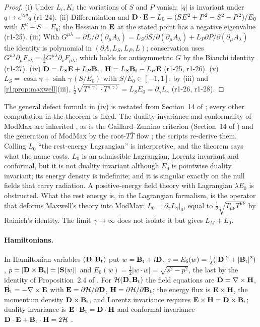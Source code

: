 \begin{proof}
(i) Under $L_i,K_i$ the variations of $S$ and $P$ vanish; $|q|$ is invariant under $q\mapsto e^{2i\theta}q$ (r1-24). (ii) Differentiation
and $\mathbf D\cdot\mathbf E-L_0=(SE^2+P^2-S^2-P^2)/E_0$ with $E^2-S=E_6$; the Hessian in $\mathbf E$ at the stated point has a negative eigenvalue
(r1-25). (iii) With $G^{\mu\lambda}=\partial L/\partial(\partial_\mu A_\lambda)=L_S\partial S/\partial(\partial_\mu A_\lambda)+L_P\partial
P/\partial(\partial_\mu A_\lambda)$ the identity is polynomial in $(\partial A,L_S,L_P,L)$; conservation uses
$G^{\mu\lambda}\partial_\mu F_{\nu\lambda}=\tfrac12G^{\mu\lambda}\partial_\nu F_{\mu\lambda}$, which holds for antisymmetric $G$ by the
Bianchi identity (r1-27). (iv) $\mathbf D=L_S\mathbf E+L_P\mathbf B_{\rm t}$, $\mathbf H=L_S\mathbf B_{\rm t}-L_P\mathbf E$ (r1-25, r1-26). (v) $L_S=\cosh\gamma+\sinh\gamma\,(S/E_0)$
with $S/E_0\in[-1,1]$; by (iii) and \cref{r1:prop:maxwell}(iii), $\tfrac12\sqrt{T^{(\gamma)}\!\cdot T^{(\gamma)}}=L_SE_0=\partial_\gamma L_\gamma$
(r1-26, r1-28).
\end{proof}

The general defect formula in (iv) is restated from Section~14 of \cite{ES17}; every other computation in the theorem is fixed. The
duality invariance and conformality of ModMax are inherited
\cite{BandosLechnerSorokinTownsend20}, as is the Gaillard--Zumino criterion \cite{GaillardZumino81,GibbonsRasheed95} (Section~14 of
\cite{ES17}) and the generation of ModMax by the root-$T\bar T$ flow \cite{BabaeiAghbolagh22}; the scripts re-derive them. Calling $L_0$
``the rest-energy Lagrangian'' is interpretive, and the theorem says what the name costs. $L_0$ is an admissible Lagrangian, Lorentz invariant
and conformal, but it is not duality invariant although $E_0$ is pointwise duality invariant; its energy density is indefinite; and it is
singular exactly on the null fields that carry radiation. A positive-energy field theory with Lagrangian $\lambda E_0$ is obstructed. What the
rest energy is, in the Lagrangian formalism, is the operator that deforms Maxwell's theory into ModMax: $L_0=\partial_\gamma L_\gamma|_0$,
equal to $\tfrac12\sqrt{T_{\mu\nu}T^{\mu\nu}}$ by Rainich's identity. The limit $\gamma\to\infty$ does not isolate it but gives $L_M+L_0$.

\paragraph{Hamiltonians.} In Hamiltonian variables $(\mathbf D,\mathbf B_{\rm t})$ put $w=\mathbf B_{\rm t}+i\mathbf D$, $s=E_6(w)=\tfrac12(|\mathbf D|^2+|\mathbf B_{\rm t}|^2)$,
$p=|\mathbf D\times\mathbf B_{\rm t}|=|\mathbf S(w)|$ and $E_0(w)=\tfrac12|w\cdot w|=\sqrt{s^2-p^2}$, the last by the identity of Proposition~2.4 of
\cite{RE}. For $\mathcal H(\mathbf D,\mathbf B_{\rm t})$ the field equations are $\dot{\mathbf D}=\nabla\times\mathbf H$, $\dot{\mathbf B_{\rm t}}=-\nabla\times\mathbf E$ with
$\mathbf E=\partial\mathcal H/\partial\mathbf D$, $\mathbf H=\partial\mathcal H/\partial\mathbf B_{\rm t}$; the energy flux is $\mathbf E\times\mathbf H$, the
momentum density $\mathbf D\times\mathbf B_{\rm t}$, and Lorentz invariance requires $\mathbf E\times\mathbf H=\mathbf D\times\mathbf B_{\rm t}$; duality invariance is
$\mathbf E\cdot\mathbf B_{\rm t}=\mathbf D\cdot\mathbf H$ and conformal invariance $\mathbf D\cdot\mathbf E+\mathbf B_{\rm t}\cdot\mathbf H=2\mathcal H$
\cite{BialynickiBirula83,BandosLechnerSorokinTownsend20}.

